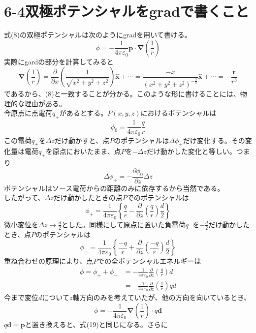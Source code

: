 \documentclass{jsarticle}
\begin{document}
\newpage
\section*{6-4\hspace{5mm}双極ポテンシャルをgradで書くこと}
\noindent
式(8)の双極ポテンシャルは次のようにgradを用いて書ける。
\begin{equation}
\phi=-\frac{1}{4\pi\varepsilon_{0}}\bm{p}\cdot\bm{\nabla}\left(\frac{1}{r}\right)
\end{equation}
実際にgardの部分を計算してみると
\[\bm{\nabla}\left(\frac{1}{r}\right)=\frac{\partial}{\partial x}\left(\frac{1}{\sqrt{x^{2}+y^{2}+z^{2}}}\right)\bm{\hat{x}}+\cdots=\frac{-x}{(x^{2}+y^{2}+z^{2})^{-\frac{3}{2}}}\bm{\hat{x}}+\cdots=-\frac{\bm{r}}{r^{3}}\]
であるから、(8)と一致することが分かる。このような形に書けることには、物理的な理由がある。\\
今原点に点電荷\(q_{+}\)があるとする。\(P(x,y,z)\)におけるポテンシャルは
\[\phi_{0}=\frac{1}{4\pi\varepsilon_{0}}\frac{q}{r}\]
この電荷\(q_{+}\)を\(\Delta z\)だけ動かすと、点\(P\)のポテンシャルは\(\Delta\phi_{+}\)だけ変化する。その変化量は電荷\(q_{+}\)を原点においたまま、点\(P\)を\(-\Delta z\)だけ動かした変化と等しい。つまり
\[\Delta\phi_{+}=-\frac{\partial\phi_{0}}{\partial z}\Delta z\]
ポテンシャルはソース電荷からの距離のみに依存するから当然である。\\
したがって、\(\Delta z\)だけ動かしたときの点\(P\)でのポテンシャルは
\[\phi_{+}=\frac{1}{4\pi\varepsilon_{0}}\left\{\frac{q}{r}-\frac{\partial}{\partial z}\left(\frac{q}{r}\right)\frac{d}{2}\right\}\]
微小変位を\(\Delta z\longrightarrow\frac{d}{2}\)とした。同様にして原点に置いた負電荷\(q_{-}\)を\(-\frac{d}{2}\)だけ動かしたとき、点\(P\)のポテンシャルは
\[\phi_{-}=\frac{1}{4\pi\varepsilon_{0}}\left\{\frac{-q}{r}+\frac{\partial}{\partial z}\left(\frac{-q}{r}\right)\frac{d}{2}\right\}\]
重ね合わせの原理により、点\(P\)での全ポテンシャルエネルギーは
\begin{align}
\phi=\phi_{+}+\phi_{-}&=-\frac{1}{4\pi\varepsilon_{0}}\frac{\partial}{\partial z}\left(\frac{q}{r}\right)d\nonumber\\
&=-\frac{1}{4\pi\varepsilon_{0}}\frac{\partial}{\partial z}\left(\frac{1}{r}\right)qd
\end{align}
今まで変位\(d\)について\(z\)軸方向のみを考えていたが、他の方向を向いているとき、
\begin{equation}
\phi=-\frac{1}{4\pi\varepsilon_{0}}\bm{\nabla}\left(\frac{1}{r}\right)\cdot q\bm{d}
\end{equation}
\(q\bm{d}=\bm{p}\)と置き換えると、式(19)と同じになる。さらに
\end{document}
